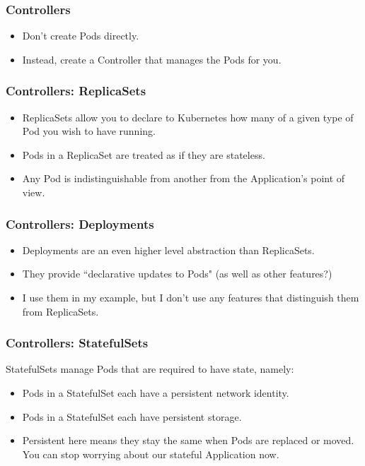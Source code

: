 \documentclass{beamer}
\begin{document}
\begin{frame}
    \frametitle{Controllers}
    \begin{itemize}
        \item Don't create Pods directly.
        \item Instead, create a Controller that manages the Pods for you.
    \end{itemize}
\end{frame}

\begin{frame}
    \frametitle{Controllers: ReplicaSets}
    \begin{itemize}
        \item ReplicaSets allow you to declare to Kubernetes how many of a given type of Pod you wish to have running.
        \item Pods in a ReplicaSet are treated as if they are stateless.
        \item Any Pod is indistinguishable from another from the Application's point of view.
    \end{itemize}
\end{frame}

\begin{frame}
    \frametitle{Controllers: Deployments}
    \begin{itemize}
        \item Deployments are an even higher level abstraction than ReplicaSets.
        \item They provide ``declarative updates to Pods" (as well as other features?)
        \item I use them in my example, but I don't use any features that distinguish them from ReplicaSets.
    \end{itemize}
\end{frame}

\begin{frame}
    \frametitle{Controllers: StatefulSets}
    StatefulSets manage Pods that are required to have state, namely:
    \begin{itemize}
        \item Pods in a StatefulSet each have a persistent network identity.
        \item Pods in a StatefulSet each have persistent storage.
        \item Persistent here means they stay the same when Pods are replaced or moved. You can stop worrying about our stateful Application now.
    \end{itemize}
\end{frame}
\end{document}
